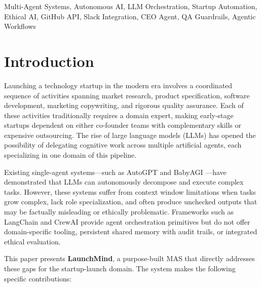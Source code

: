 \documentclass[conference]{IEEEtran}
\begin{document}
\begin{IEEEkeywords}
Multi-Agent Systems, Autonomous AI, LLM Orchestration, Startup Automation, Ethical AI, GitHub API, Slack Integration, CEO Agent, QA Guardrails, Agentic Workflows
\end{IEEEkeywords}

\section{Introduction}
\label{sec:intro}

Launching a technology startup in the modern era involves a coordinated sequence of activities spanning market research, product specification, software development, marketing copywriting, and rigorous quality assurance. Each of these activities traditionally requires a domain expert, making early-stage startups dependent on either co-founder teams with complementary skills or expensive outsourcing. The rise of large language models (LLMs) has opened the possibility of delegating cognitive work across multiple artificial agents, each specializing in one domain of this pipeline.

Existing single-agent systems—such as AutoGPT \cite{autogpt2023} and BabyAGI \cite{babyagi2023}—have demonstrated that LLMs can autonomously decompose and execute complex tasks. However, these systems suffer from context window limitations when tasks grow complex, lack role specialization, and often produce unchecked outputs that may be factually misleading or ethically problematic. Frameworks such as LangChain \cite{langchain2022} and CrewAI \cite{crewai2024} provide agent orchestration primitives but do not offer domain-specific tooling, persistent shared memory with audit trails, or integrated ethical evaluation.

This paper presents \textbf{LaunchMind}, a purpose-built MAS that directly addresses these gaps for the startup-launch domain. The system makes the following specific contributions:
\end{document}
